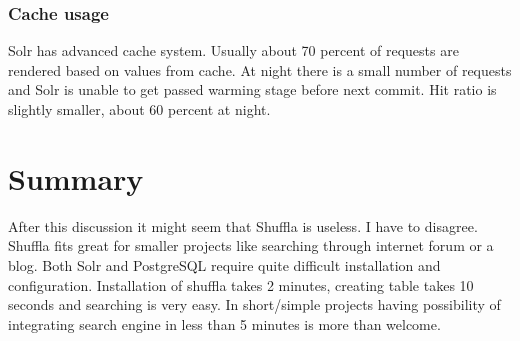 \documentclass[10pt,a4paper]{article}
\begin{document}
\subsubsection*{Cache usage}
Solr has advanced cache system. Usually about 70 percent of requests are rendered based on values from cache.  At night there is a small number of requests and Solr is unable to get passed warming stage before next commit.  Hit ratio is slightly smaller, about 60 percent at night.

\section{Summary}

After this discussion it might seem that Shuffla is useless. I have to disagree. Shuffla fits great for smaller projects like searching through internet forum or a blog. Both Solr and PostgreSQL require quite difficult installation and configuration. Installation of shuffla takes 2 minutes, creating table takes 10 seconds and searching is very easy. In short/simple projects having possibility of integrating search engine in less than 5 minutes is more than welcome.




\end{document}
